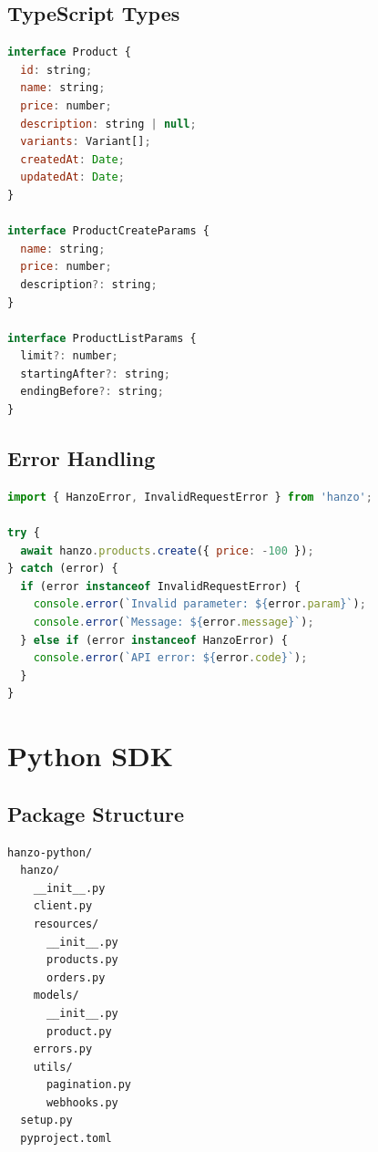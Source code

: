 \documentclass[11pt,a4paper]{article}
\begin{document}
\subsection{TypeScript Types}

\begin{lstlisting}[language=JavaScript, caption=Generated Types]
interface Product {
  id: string;
  name: string;
  price: number;
  description: string | null;
  variants: Variant[];
  createdAt: Date;
  updatedAt: Date;
}

interface ProductCreateParams {
  name: string;
  price: number;
  description?: string;
}

interface ProductListParams {
  limit?: number;
  startingAfter?: string;
  endingBefore?: string;
}
\end{lstlisting}

\subsection{Error Handling}

\begin{lstlisting}[language=JavaScript, caption=JavaScript Error Handling]
import { HanzoError, InvalidRequestError } from 'hanzo';

try {
  await hanzo.products.create({ price: -100 });
} catch (error) {
  if (error instanceof InvalidRequestError) {
    console.error(`Invalid parameter: ${error.param}`);
    console.error(`Message: ${error.message}`);
  } else if (error instanceof HanzoError) {
    console.error(`API error: ${error.code}`);
  }
}
\end{lstlisting}

\section{Python SDK}

\subsection{Package Structure}

\begin{lstlisting}[caption=Python SDK Structure]
hanzo-python/
  hanzo/
    __init__.py
    client.py
    resources/
      __init__.py
      products.py
      orders.py
    models/
      __init__.py
      product.py
    errors.py
    utils/
      pagination.py
      webhooks.py
  setup.py
  pyproject.toml
\end{lstlisting}
\end{document}
